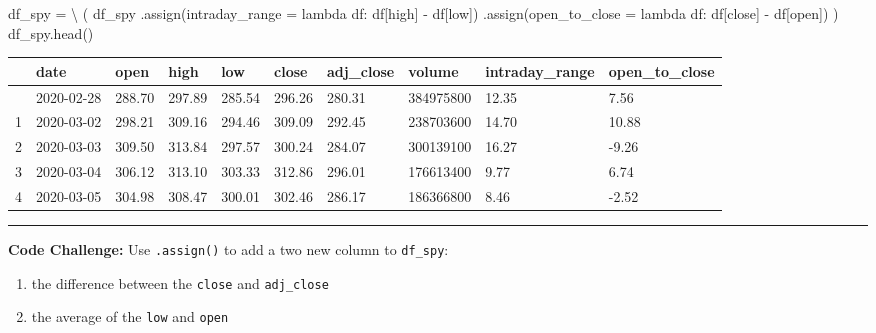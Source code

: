 \documentclass[
  letterpaper,
  DIV=11,
  numbers=noendperiod]{scrreprt}
\newenvironment{Shaded}{\begin{snugshade}}{\end{snugshade}}
\newcommand{\KeywordTok}[1]{\textcolor[rgb]{0.00,0.23,0.31}{#1}}
\newcommand{\NormalTok}[1]{\textcolor[rgb]{0.00,0.23,0.31}{#1}}
\newcommand{\OperatorTok}[1]{\textcolor[rgb]{0.37,0.37,0.37}{#1}}
\newcommand{\StringTok}[1]{\textcolor[rgb]{0.13,0.47,0.30}{#1}}
\providecommand{\tightlist}{%
  \setlength{\itemsep}{0pt}\setlength{\parskip}{0pt}}\usepackage{longtable,booktabs,array}
\begin{document}
\begin{Shaded}
\begin{Highlighting}[]
\NormalTok{df\_spy }\OperatorTok{=} \OperatorTok{\textbackslash{}}
\NormalTok{    (}
\NormalTok{    df\_spy}
\NormalTok{        .assign(intraday\_range }\OperatorTok{=} \KeywordTok{lambda}\NormalTok{ df: df[}\StringTok{\textquotesingle{}high\textquotesingle{}}\NormalTok{] }\OperatorTok{{-}}\NormalTok{ df[}\StringTok{\textquotesingle{}low\textquotesingle{}}\NormalTok{])}
\NormalTok{        .assign(open\_to\_close }\OperatorTok{=} \KeywordTok{lambda}\NormalTok{ df: df[}\StringTok{\textquotesingle{}close\textquotesingle{}}\NormalTok{] }\OperatorTok{{-}}\NormalTok{ df[}\StringTok{\textquotesingle{}open\textquotesingle{}}\NormalTok{])}
\NormalTok{    )}
\NormalTok{df\_spy.head()}
\end{Highlighting}
\end{Shaded}

\begin{longtable}[]{@{}llllllllll@{}}
\toprule\noalign{}
& date & open & high & low & close & adj\_close & volume &
intraday\_range & open\_to\_close \\
\midrule\noalign{}
\endhead
\bottomrule\noalign{}
\endlastfoot
0 & 2020-02-28 & 288.70 & 297.89 & 285.54 & 296.26 & 280.31 & 384975800
& 12.35 & 7.56 \\
1 & 2020-03-02 & 298.21 & 309.16 & 294.46 & 309.09 & 292.45 & 238703600
& 14.70 & 10.88 \\
2 & 2020-03-03 & 309.50 & 313.84 & 297.57 & 300.24 & 284.07 & 300139100
& 16.27 & -9.26 \\
3 & 2020-03-04 & 306.12 & 313.10 & 303.33 & 312.86 & 296.01 & 176613400
& 9.77 & 6.74 \\
4 & 2020-03-05 & 304.98 & 308.47 & 300.01 & 302.46 & 286.17 & 186366800
& 8.46 & -2.52 \\
\end{longtable}

\begin{center}\rule{0.5\linewidth}{0.5pt}\end{center}

\textbf{Code Challenge:} Use \texttt{.assign()} to add a two new column
to \texttt{df\_spy}:

\begin{enumerate}
\def\labelenumi{\arabic{enumi}.}
\tightlist
\item
  the difference between the \texttt{close} and \texttt{adj\_close}
\item
  the average of the \texttt{low} and \texttt{open}
\end{enumerate}
\end{document}
